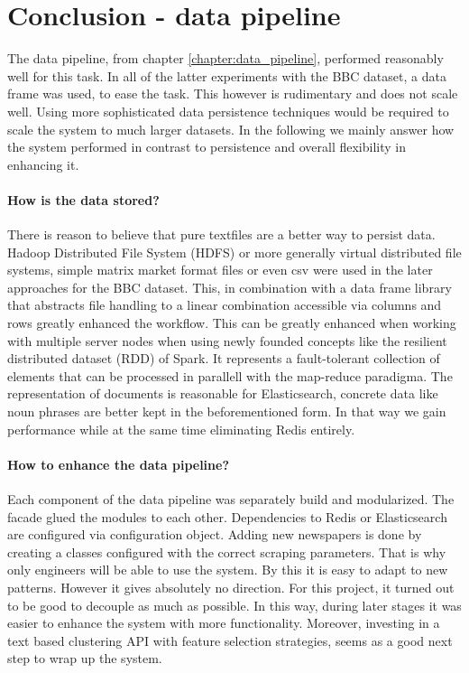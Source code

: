 \section{Conclusion - data pipeline}

The data pipeline, from chapter \ref{chapter:data_pipeline}, performed reasonably well for this task. In all of the latter experiments with the BBC dataset, a data frame was used, to ease the task. This however is rudimentary and does not scale well. Using more sophisticated data persistence techniques would be required to scale the system to much larger datasets. In the following we mainly answer how the system performed in contrast to persistence and overall flexibility in enhancing it.

\paragraph{How is the data stored?} There is reason to believe that pure textfiles are a better way to persist data. Hadoop Distributed File System (HDFS) or more generally virtual distributed file systems, simple matrix market format files or even csv were used in the later approaches for the BBC dataset. This, in combination with a data frame library that abstracts file handling to a linear combination accessible via columns and rows greatly enhanced the workflow. This can be greatly enhanced when working with multiple server nodes when using newly founded concepts like the resilient distributed dataset (RDD) of Spark. It represents a fault-tolerant collection of elements that can be processed in parallell with the map-reduce paradigma. The representation of documents is reasonable for Elasticsearch, concrete data like noun phrases are better kept in the beforementioned form. In that way we gain performance while at the same time eliminating Redis entirely.

\paragraph{How to enhance the data pipeline?} Each component of the data pipeline was separately build and modularized. The facade glued the modules to each other. Dependencies to Redis or Elasticsearch are configured via configuration object. Adding new newspapers is done by creating a classes configured with the correct scraping parameters. That is why only engineers will be able to use the system. By this it is easy to adapt to new patterns. However it gives absolutely no direction. For this project, it turned out to be good to decouple as much as possible. In this way, during later stages it was easier to enhance the system with more functionality. Moreover, investing in a text based clustering API with feature selection strategies, seems as a good next step to wrap up the system. 

